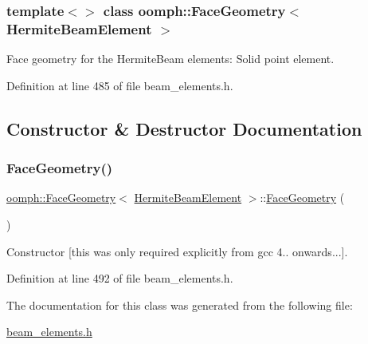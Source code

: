 \subsubsection*{template$<$$>$\newline
class oomph\+::\+Face\+Geometry$<$ Hermite\+Beam\+Element $>$}

Face geometry for the Hermite\+Beam elements\+: Solid point element. 

Definition at line 485 of file beam\+\_\+elements.\+h.



\subsection{Constructor \& Destructor Documentation}
\mbox{\label{classoomph_1_1FaceGeometry_3_01HermiteBeamElement_01_4_a26c1c7ad8826478f991d3e5ef11036da}} 
\subsubsection{\texorpdfstring{Face\+Geometry()}{FaceGeometry()}}
{\footnotesize\ttfamily \hyperlink{classoomph_1_1FaceGeometry}{oomph\+::\+Face\+Geometry}$<$ \hyperlink{classoomph_1_1HermiteBeamElement}{Hermite\+Beam\+Element} $>$\+::\hyperlink{classoomph_1_1FaceGeometry}{Face\+Geometry} (\begin{DoxyParamCaption}{ }\end{DoxyParamCaption})\hspace{0.3cm}{\ttfamily [inline]}}



Constructor \mbox{[}this was only required explicitly from gcc 4.. onwards...\mbox{]}. 



Definition at line 492 of file beam\+\_\+elements.\+h.



The documentation for this class was generated from the following file\+:\begin{DoxyCompactItemize}
\item 
\hyperlink{beam__elements_8h}{beam\+\_\+elements.\+h}\end{DoxyCompactItemize}
